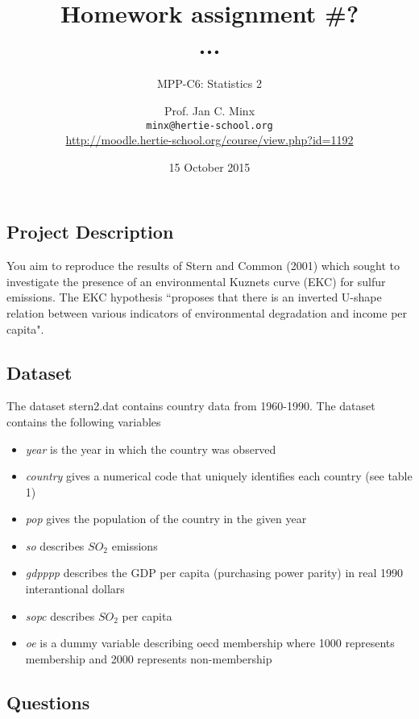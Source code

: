 \documentclass{scrartcl}
\begin{document}
	\title{Homework assignment \#?\\ ...}
	\subtitle{MPP-C6: Statistics 2}
	\author{Prof. Jan C. Minx\\ \texttt{minx@hertie-school.org} \\
		\url{http://moodle.hertie-school.org/course/view.php?id=1192}}
	\date{15 October 2015}
	
	\maketitle

	\subsection*{Project Description}
	You aim to reproduce the results of Stern and Common (2001) which sought to investigate the presence of an environmental Kuznets curve (EKC) for sulfur emissions. The EKC hypothesis ``proposes that there is an inverted U-shape relation between various indicators of environmental degradation and income per capita"\cite{stern2001there}.
	
	\subsection*{Dataset}
	The dataset stern2.dat contains country data from 1960-1990. The dataset contains the following variables
	\begin{itemize}
	\item \textit{year} is the year in which the country was observed 
	\item \textit{country} gives a numerical code that uniquely identifies each country (see table 1)
	\item \textit{pop} gives the population of the country in the given year
	\item \textit{so} describes \(SO_2\) emissions
	\item \textit{gdpppp} describes the GDP per capita (purchasing power parity) in real 1990 interantional dollars
	\item \textit{sopc} describes \(SO_2\) per capita
	\item \textit{oe} is a dummy variable describing oecd membership where 1000 represents membership and 2000 represents non-membership
	\end{itemize}
	
	\subsection*{Questions}
	
\end{document}
